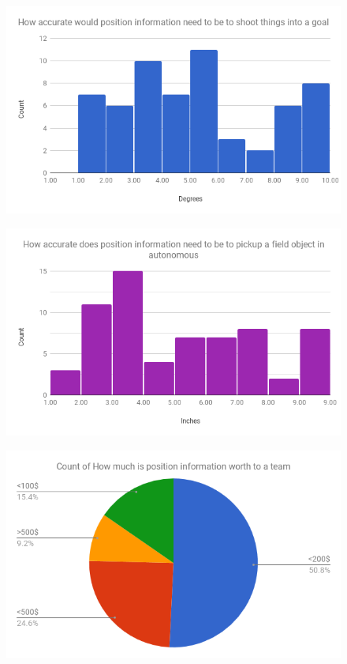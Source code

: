 \documentclass{article}
\begin{document}
  \begin{figure}[H]
    \centering
    \includegraphics[width=1\linewidth]{./survey_angle.png}
    \label{fig:survey_angle}
  \end{figure}

  \begin{figure}[H]
    \centering
    \includegraphics[width=1\linewidth]{./survey_position.png}
    \label{fig:survey_position}
  \end{figure}

  \begin{figure}[H]
    \centering
    \includegraphics[width=1\linewidth]{./survey_worth.png}
    \label{fig:survey_worth}
  \end{figure}




\end{document}
